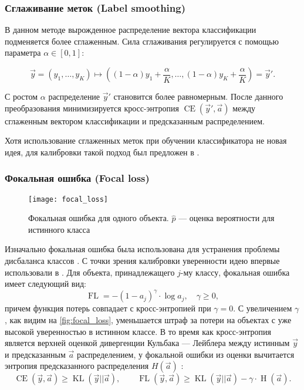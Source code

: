 \documentclass[12pt]{article}
\begin{document}
\subsubsection{Сглаживание меток (Label smoothing)}

В данном методе вырожденное распределение вектора классификации подменяется более сглаженным. Сила сглаживания регулируется с помощью параметра $\alpha \in [0, 1]$:

\begin{equation}
    \vec{y}=\left(y_1,\dots,y_K\right)
    \mapsto
    \left(
        (1-\alpha)y_1 + \frac{\alpha}{K},
        \dots,
        (1-\alpha)y_K + \frac{\alpha}{K}
    \right)=\vec{y}'.
\end{equation}

С ростом $\alpha$ распределение $\vec{y}'$ становится более равномерным. После данного преобразования минимизируется кросс-энтропия $\operatorname{CE}(\vec{y}',\vec{a})$ между сглаженным вектором классификации и предсказанным распределением.

Хотя использование сглаженных меток при обучении классификатора не новая идея, для калибровки такой подход был предложен в \cite{smoothing}.

\subsubsection{Фокальная ошибка (Focal loss)}

\begin{figure}[!h]
    \texttt{[image: focal\_loss]}
    \centering
    \caption{Фокальная ошибка для одного объекта. $\hat{p}$ --- оценка вероятности для истинного класса}
    \label{fig:focal_loss}
\end{figure}

Изначально фокальная ошибка была использована для устранения проблемы дисбаланса классов \cite{focal_detection}. С точки зрения калибровки уверенности идею впервые использовали в \cite{focal_calib}. Для объекта, принадлежащего $j$-му классу, фокальная ошибка имеет следующий вид:
\begin{equation}
    \operatorname{FL}=-(1-a_{j})^{\gamma}\cdot \log a_j, \quad \gamma \geqslant 0,
\end{equation}
причем функция потерь совпадает с кросс-энтропией при $\gamma=0$. С увеличением $\gamma$, как видим на \autoref{fig:focal_loss}, уменьшается штраф за потери на объектах с уже высокой уверенностью в истинном классе. В то время как кросс-энтропия является верхней оценкой дивергенции Кульбака --- Лейблера между истинным $\vec{y}$ и предсказанным $\vec{a}$ распределением, у фокальной ошибки из оценки вычитается энтропия предсказанного распределения $H(\vec{a})$ \cite{focal_calib}:
\begin{equation*}
    \operatorname{CE}(\vec{y},\vec{a})
    \geqslant
    \operatorname{KL}(\vec{y}||\vec{a}),
    \qquad
    \operatorname{FL}(\vec{y},\vec{a})
    \geqslant
    \operatorname{KL}(\vec{y}||\vec{a})-\gamma\cdot \operatorname{H}(\vec{a}).
\end{equation*}
\end{document}
